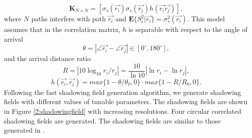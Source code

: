 \begin{equation}
\mathbf{K}_{N\times N} = [ \sigma_{s}(\vec{r_{i}})\sigma_{s}(\vec{r_{j}})h(\vec{r_{i}}\vec{r_{j}})],
\label{2:correlationmatrix}
\end{equation}
where $N$ paths interfere with path $\vec{r_{i}}$ and $\mathbf{E}\{S_{i}^{2}|\vec{r_{i}}\}=\sigma_{s}^{2}(\vec{r_{i}})$. This model assumes that in the correlation matrix, $h$ is separable with respect to the angle of arrival
\begin{equation}
\theta = |\angle\vec{r_{i}}-\angle\vec{r_{j}}|\in [0^{\circ},180^{\circ}],
\end{equation}
and the arrival distance ratio
\begin{equation}
R=|10\log_{10}r_{i}/r_{j}|=\frac{10}{\ln 10}|\ln r_{i}-\ln r_{j}|,
\end{equation}
\begin{equation}
h(\vec{r_{i}},\vec{r_{j}})=max\{1-\theta/\theta_{0},0\}\cdot max\{1-R/R_{0},0\}.
\end{equation}
Following the fast shadowing field generation algorithm, we generate shadowing fields with different values of tunable parameters. The shadowing fields are shown in Figure \ref{2:shadowingfield} with increasing resolutions. Four circular correlated shadowing fields are generated.
The shadowing fields are similar to those generated in \cite{szyszkowicz2011interference}.
